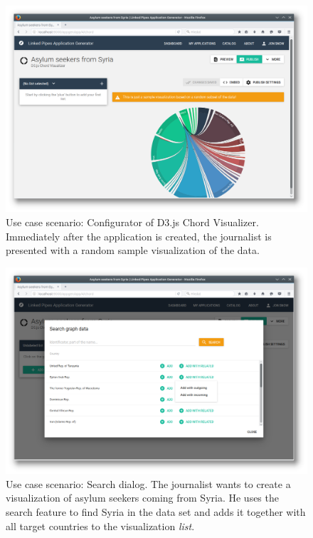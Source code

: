 \begin{figure}
	\centering
	\includegraphics[width=145mm]{img/05_scenario_04_graph_sample.png}
	\caption{Use case scenario: Configurator of D3.js Chord Visualizer. Immediately after the application is created, the journalist is presented with a random sample visualization of the data.}
	\label{fig:scenario-04-graph-sample}
\end{figure}

\begin{figure}
	\centering
	\includegraphics[width=145mm]{img/05_scenario_05_search_graph}
	\caption{Use case scenario: Search dialog. The journalist wants to create a visualization of asylum seekers coming from Syria. He uses the search feature to find Syria in the data set and adds it together with all target countries to the visualization \emph{list}.}
	\label{fig:scenario-05-search-graph}
\end{figure}

